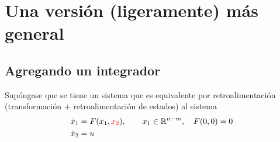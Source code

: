\section{Una versión (ligeramente) más general}
\subsection{Agregando un integrador}
Supóngase que se tiene un sistema que es equivalente por retroalimentación (transformación $+$ retroalimentación de estados) al sistema
\begin{equation*}
    \begin{aligned}
        \dot{x}_1 &= F(x_1, \textcolor{red}{x_2}), \quad \quad x_1 \in \mathbb{R}^{n-m}, \quad F(0,0) = 0 \\
        \dot{x}_2 &= u
    \end{aligned}
    \label{eq: backstepping_integrador_2}
\end{equation*}


